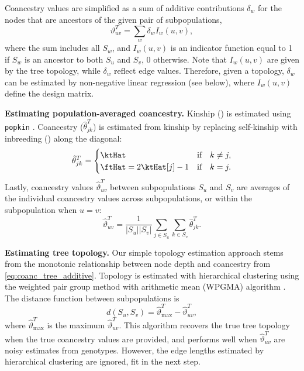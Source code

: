 \documentclass[11pt]{article}
\begin{document}
Coancestry values are simplified as a sum of additive contributions $\delta_w$ for the nodes that are ancestors of the given pair of subpopulations,
\begin{equation}
  \label{eq:coanc_tree_additive}
  \vartheta_{uv}^T
  =
  \sum_w \delta_w I_w(u,v)
  ,
\end{equation}
where the sum includes all $S_w$, and $I_w(u,v)$ is an indicator function equal to 1 if $S_w$ is an ancestor to both $S_u$ and $S_v$, 0 otherwise.
Note that $I_w(u,v)$ are given by the tree topology, while $\delta_w$ reflect edge values.
Therefore, given a topology, $\delta_w$ can be estimated by non-negative linear regression (see below), where $I_w(u,v)$ define the design matrix.

\textbf{Estimating population-averaged coancestry.}
Kinship (\ktHat) is estimated using \texttt{popkin} \citep{ochoa_estimating_2021}.
Coancestry ($\hat{\theta}_{jk}^T$) is estimated from kinship by replacing self-kinship with inbreeding (\ftHat) along the diagonal:
\begin{equation}
  \label{eq:kinship_to_coanc}
  \hat{\theta}_{jk}^T
  =
  \begin{cases}
    \ktHat & \text{if} \quad k \ne j, \\
    \ftHat = 2 \ktHat[j] - 1 & \text{if} \quad k = j.
  \end{cases}
\end{equation}
Lastly, coancestry values $\hat{\vartheta}_{uv}^T$ between subpopulations $S_u$ and $S_v$ are averages of the individual coancestry values across subpopulations, or within the subpopulation when $u=v$:
$$
\hat{\vartheta}_{uv}^T
=
\frac{1}{|S_u||S_v|} \sum_{j \in S_u} \sum_{k \in S_v} \hat{\theta}_{jk}^T
.
$$

\textbf{Estimating tree topology.}
Our simple topology estimation approach stems from the monotonic relationship between node depth and coancestry from \cref{eq:coanc_tree_additive}.
Topology is estimated with hierarchical clustering using the weighted pair group method with arithmetic mean (WPGMA) algorithm \citep{sokal_statistical_1958}.
The distance function between subpopulations is
$$
d( S_u, S_v ) = \hat{\vartheta}_\text{max}^T - \hat{\vartheta}_{uv}^T,
$$
where $\hat{\vartheta}_\text{max}^T$ is the maximum $\hat{\vartheta}_{uv}^T$.
This algorithm recovers the true tree topology when the true coancestry values are provided, and performs well when $\hat{\vartheta}_{uv}^T$ are noisy estimates from genotypes.
However, the edge lengths estimated by hierarchical clustering are ignored, fit in the next step.
\end{document}
